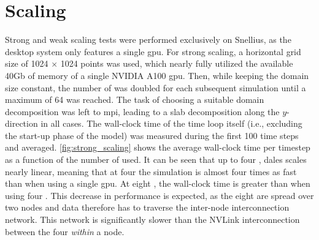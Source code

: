 \section{Scaling}
Strong and weak scaling tests were performed exclusively on Snellius, as the desktop system only features a single \acrshort{gpu}. For strong scaling, a horizontal grid size of 1024 $\times$ 1024 points was used, which nearly fully utilized the available 40Gb of memory of a single NVIDIA A100 \acrshort{gpu}. Then, while keeping the domain size constant, the number of  was doubled for each subsequent simulation until a maximum of 64  was reached. The task of choosing a suitable domain decomposition was left to \acrshort{mpi}, leading to a slab decomposition along the $y$-direction in all cases. The wall-clock time of the time loop itself (i.e., excluding the start-up phase of the model) was measured during the first 100 time steps and averaged. \autoref{fig:strong_scaling} shows the average wall-clock time per timestep as a function of the number of  used. It can be seen that up to four , \acrshort{dales} scales nearly linear, meaning that at four  the simulation is almost four times as fast than when using a single \acrshort{gpu}. At eight , the wall-clock time is greater than when using four . This decrease in performance is expected, as the eight  are spread over two nodes and data therefore has to traverse the inter-node interconnection network. This network is significantly slower than the NVLink interconnection between the four  \emph{within} a node.

